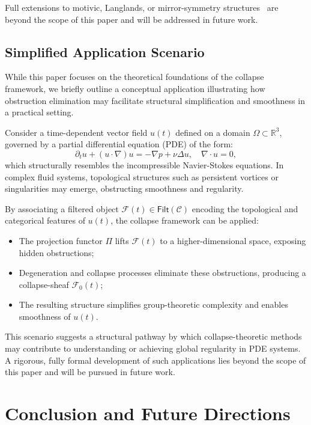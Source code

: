 \documentclass[11pt]{article}
\begin{document}
Full extensions to motivic, Langlands, or mirror-symmetry structures~\cite{MirrorSymmetry2003} are beyond the scope of this paper and will be addressed in future work.



\subsection{Simplified Application Scenario}

While this paper focuses on the theoretical foundations of the collapse framework, we briefly outline a conceptual application illustrating how obstruction elimination may facilitate structural simplification and smoothness in a practical setting.

Consider a time-dependent vector field $u(t)$ defined on a domain $\Omega \subset \mathbb{R}^3$, governed by a partial differential equation (PDE) of the form:
\[
\partial_t u + (u \cdot \nabla)u = -\nabla p + \nu \Delta u, \quad \nabla \cdot u = 0,
\]
which structurally resembles the incompressible Navier-Stokes equations. In complex fluid systems, topological structures such as persistent vortices or singularities may emerge, obstructing smoothness and regularity.

By associating a filtered object $\mathcal{F}(t) \in \mathsf{Filt}(\mathcal{C})$ encoding the topological and categorical features of $u(t)$, the collapse framework can be applied:
\begin{itemize}
    \item The projection functor $\Pi$ lifts $\mathcal{F}(t)$ to a higher-dimensional space, exposing hidden obstructions;
    \item Degeneration and collapse processes eliminate these obstructions, producing a collapse-sheaf $\mathcal{F}_0(t)$;
    \item The resulting structure simplifies group-theoretic complexity and enables smoothness of $u(t)$.
\end{itemize}

This scenario suggests a structural pathway by which collapse-theoretic methods may contribute to understanding or achieving global regularity in PDE systems. A rigorous, fully formal development of such applications lies beyond the scope of this paper and will be pursued in future work.


\section{Conclusion and Future Directions}
\end{document}
